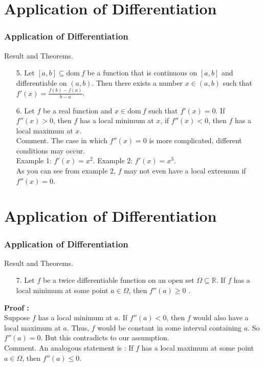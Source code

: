 \documentclass[12pt, t]{beamer}
\begin{document}
\section{Application of Differentiation}
\begin{frame}
    \frametitle{Application of Differentiation}
    Result and Theorems.\\
    \begin{enumerate}
        \item[5.] Let $[a,b]\subseteq\text{dom}\ f$ be a function that is continuous on $[a,b]$ and differentiable on $(a,b)$.
            Then there exists a number $x\in(a,b)$ such that $f'(x)=\frac{f(b)-f(a)}{b-a}$.
            \vspace{0.5em}
        \item[6.] Let $f$ be a real function and $x\in \text{dom}\ f$ such that $f'(x)=0$. If $f''(x)>0$, then $f$ has a local minimum at $x$,
            if $f''(x)<0$, then $f$ has a local maximum at $x$.\\
            \vspace{0.3em}
            Comment. The case in which $f''(x)=0$ is more complicated, different conditions may occur.\\
            \hspace{1em}Example 1: $f'(x)=x^2$.
            \hspace{1em}Example 2: $f'(x)=x^3$.\\
            As you can see from example 2, $f$ may not even have a local extremum if $f''(x)=0$.

    \end{enumerate}


\end{frame}

\section{Application of Differentiation}
\begin{frame}
    \frametitle{Application of Differentiation}
    Result and Theorems.\\
    \begin{enumerate}
        \item[7.] Let $f$ be a twice differentiable function on an open set $\Omega\subseteq \mathbb{R}$.
            If $f$ has a local minimum at some point $a\in \Omega$, then $f''(a)\geq 0$ .
    \end{enumerate}
    \textbf{Proof : }\\
    \hspace{1em} Suppose $f$ has a local minimum at $a$. If $f''(a)<0$, then $f$ would also have a local maximum at $a$.
    Thus, $f$ would be constant in some interval containing $a$. So $f''(a)=0$. But this contradicts to our assumption.\\
    \vspace{2em}
    Comment. An analogous statement is : If $f$ has a local maximum at some point $a\in\Omega$, then $f''(a)\leq 0$.

\end{frame}
\end{document}
